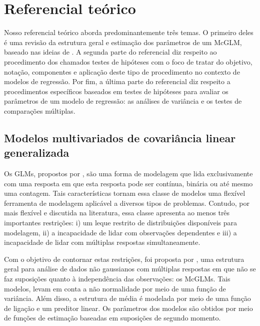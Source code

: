 
\chapter{Referencial teórico}\label{cap:referencial}


Nosso referencial teórico aborda predominantemente três temas. O primeiro deles é uma revisão da estrutura geral e estimação dos parâmetros de um McGLM, baseado nas ideias de \citet{Bonat16}. A segunda parte do referencial diz respeito ao procedimento dos chamados testes de hipóteses com o foco de tratar do objetivo, notação, componentes e aplicação deste tipo de procedimento no contexto de modelos de regressão. Por fim, a última parte do referencial diz respeito a procedimentos específicos baseados em testes de hipóteses para avaliar os parâmetros de um modelo de regressão: as análises de variância e os testes de comparações múltiplas.


\section{Modelos multivariados de covariância linear generalizada}

Os GLMs, propostos por \citet{Nelder72}, são uma forma de modelagem que lida exclusivamente com uma resposta em que esta resposta pode ser contínua, binária ou até mesmo uma contagem. Tais características tornam essa classe de modelos uma flexível ferramenta de modelagem aplicável a diversos tipos de problemas. Contudo, por mais flexível e discutida na literatura, essa classe apresenta ao menos três importantes restrições: i) um leque restrito de distribuições disponíveis para modelagem, ii) a incapacidade de lidar com observações dependentes e iii) a incapacidade de lidar com múltiplas respostas simultaneamente. 

Com o objetivo de contornar estas restrições, foi proposta por \citet{Bonat16}, uma estrutura geral para análise de dados não gaussianos com múltiplas respostas em que não se faz suposições quanto à independência das observações: os McGLMs. Tais modelos, levam em conta a não normalidade por meio de uma função de variância. Além disso, a estrutura de média é modelada por meio de uma função de ligação e um preditor linear. Os parâmetros dos modelos são obtidos por meio de funções de estimação baseadas em suposições de segundo momento.

